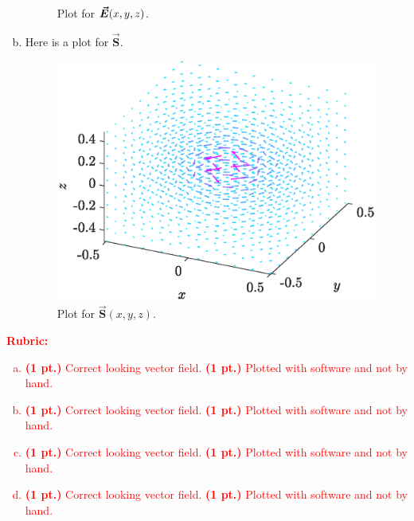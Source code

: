 \documentclass[12pt]{article} %
\begin{document}
\begin{solution}
\begin{enumerate}[(a)]
\begin{figure}[H]
        \caption{Plot for $\boldsymbol{\vec{E}}(x,y,z)$.}
    \end{figure}
    \item Here is a plot for $\boldsymbol{\vec{S}}$.
    \begin{figure}[H]
        \centering
        \includegraphics[width=.65\textwidth]{figures/4d}
        \caption{Plot for $\boldsymbol{\vec{S}}(x,y,z)$.}
    \end{figure}
\end{enumerate}
\end{solution}
\textcolor{red}{
\noindent \textbf{Rubric:}
\begin{enumerate}[(a)]
    \item \textbf{(1 pt.)} Correct looking vector field. \textbf{(1 pt.)} Plotted with software and not by hand.
    \item \textbf{(1 pt.)} Correct looking vector field. \textbf{(1 pt.)} Plotted with software and not by hand.
    \item \textbf{(1 pt.)} Correct looking vector field. \textbf{(1 pt.)} Plotted with software and not by hand.
    \item \textbf{(1 pt.)} Correct looking vector field. \textbf{(1 pt.)} Plotted with software and not by hand.
\end{enumerate}
}
\end{document}
